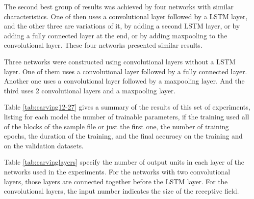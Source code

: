 
The second best group of results was achieved by four networks with similar characteristics. One of then uses a convolutional layer followed by a LSTM layer, and the other three are variations of it, by adding a second LSTM layer, or by adding a fully connected layer at the end, or by adding maxpooling to the convolutional layer. These four networks presented similar results.

Three networks were constructed using convolutional layers without a LSTM layer. One of them uses a convolutional layer followed by a fully connected layer. Another one uses a convolutional layer followed by a maxpooling layer. And the third uses 2 convolutional layers and a maxpooling layer.



Table \ref{tab:carving12-27} gives a summary of the results of this set of experiments, listing for each model the number of trainable parameters, if the training used all of the blocks of the sample file or just the first one, the number of training epochs, the duration of the training, and the final accuracy on the training and on the validation datasets.


Table \ref{tab:carvinglayers} specify the number of output units in each layer of the networks used in the experiments. For the networks with two convolutional layers, those layers are connected together before the LSTM layer. For the convolutional layers, the input number indicates the size of the receptive field. 


